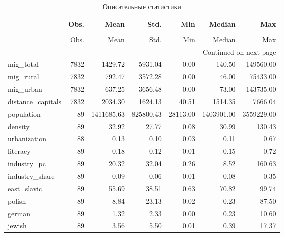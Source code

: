 \begin{longtable}{lrrrrrr}
\caption{Описательные статистики}
\label{table:sum}\\
\toprule
{} &  Obs. &        Mean &       Std. &       Min &      Median &         Max \\
\midrule
\endfirsthead
\caption[]{Описательные статистики} \\
\toprule
{} &  Obs. &        Mean &       Std. &       Min &      Median &         Max \\
\midrule
\endhead
\midrule
\multicolumn{7}{r}{{Continued on next page}} \\
\midrule
\endfoot

\bottomrule
\endlastfoot
mig\_total         &  7832 &     1429.72 &    5931.04 &      0.00 &      140.50 &   149560.00 \\
mig\_rural         &  7832 &      792.47 &    3572.28 &      0.00 &       46.00 &    75433.00 \\
mig\_urban         &  7832 &      637.25 &    3656.48 &      0.00 &       73.00 &   143735.00 \\
distance\_capitals &  7832 &     2034.30 &    1624.13 &     40.51 &     1514.35 &     7666.04 \\
population        &    89 &  1411685.63 &  825800.43 &  28113.00 &  1403901.00 &  3559229.00 \\
density           &    89 &       32.92 &      27.77 &      0.08 &       30.99 &      130.43 \\
urbanization      &    88 &        0.13 &       0.10 &      0.03 &        0.11 &        0.67 \\
literacy          &    89 &        0.18 &       0.12 &      0.01 &        0.15 &        0.72 \\
industry\_pc       &    89 &       20.32 &      32.04 &      0.26 &        8.52 &      160.63 \\
industry\_share    &    89 &        0.09 &       0.06 &      0.01 &        0.08 &        0.35 \\
east\_slavic       &    89 &       55.69 &      38.51 &      0.63 &       70.82 &       99.74 \\
polish            &    89 &        8.84 &      23.13 &      0.02 &        0.23 &       87.50 \\
german            &    89 &        1.32 &       2.33 &      0.00 &        0.23 &       10.60 \\
jewish            &    89 &        3.56 &       5.50 &      0.01 &        0.39 &       17.37 \\

\end{longtable}
